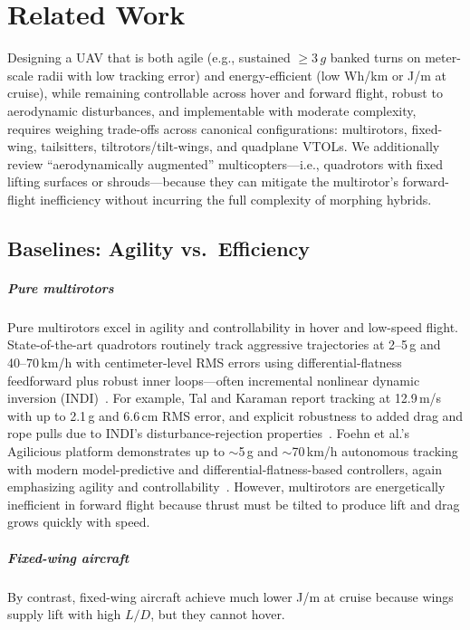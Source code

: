 
\chapter{Related Work}\label{chapter:related-work}

Designing a UAV that is both agile (e.g., sustained $\geq 3\,g$ banked turns on meter-scale radii with low tracking error) and energy-efficient (low Wh/km or J/m at cruise), while remaining controllable across hover and forward flight, robust to aerodynamic disturbances, and implementable with moderate complexity, requires weighing trade-offs across canonical configurations: multirotors, fixed-wing, tailsitters, tiltrotors/tilt-wings, and quadplane VTOLs.
We additionally review ``aerodynamically augmented'' multicopters---i.e., quadrotors with fixed lifting surfaces or shrouds---because they can mitigate the multirotor's forward-flight inefficiency without incurring the full complexity of morphing hybrids.


\section{Baselines: Agility vs.\ Efficiency}

\paragraph{Pure multirotors}
Pure multirotors excel in agility and controllability in hover and low-speed flight.
State-of-the-art quadrotors routinely track aggressive trajectories at 2--5\,g and 40--70\,km/h with centimeter-level RMS errors using differential-flatness feedforward plus robust inner loops---often incremental nonlinear dynamic inversion (INDI)~\cite{Tal2018,Tal2021,Foehn2022}.
For example, Tal and Karaman report tracking at 12.9\,m/s with up to 2.1\,g and 6.6\,cm RMS error, and explicit robustness to added drag and rope pulls due to INDI's disturbance-rejection properties~\cite{Tal2018}.
Foehn et al.'s Agilicious platform demonstrates up to $\sim$5\,g and $\sim$70\,km/h autonomous tracking with modern model-predictive and differential-flatness-based controllers, again emphasizing agility and controllability~\cite{Foehn2022}.
However, multirotors are energetically inefficient in forward flight because thrust must be tilted to produce lift and drag grows quickly with speed.

\paragraph{Fixed-wing aircraft}
By contrast, fixed-wing aircraft achieve much lower J/m at cruise because wings supply lift with high $L/D$, but they cannot hover.


